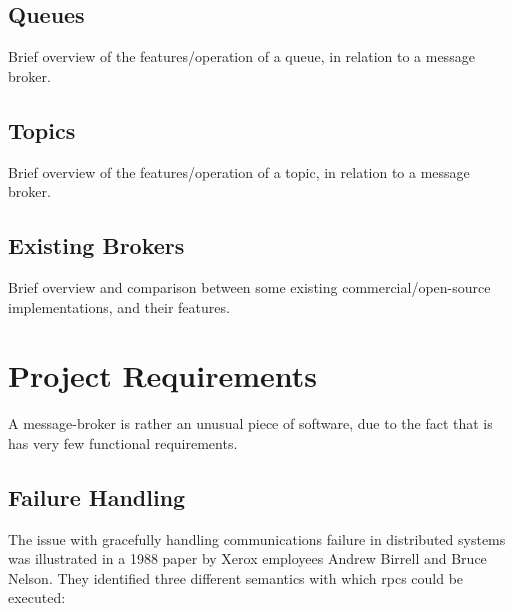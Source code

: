 \subsection{Queues}
\label{sub:Queues}

Brief overview of the features/operation of a queue, in relation to a message broker.


\subsection{Topics}
\label{sub:Topics}

Brief overview of the features/operation of a topic, in relation to a message broker.

\subsection{Existing Brokers}
\label{sub:Existing Brokers}

Brief overview and comparison between some existing commercial/open-source
implementations, and their features.


\section{Project Requirements}
\label{sec:SLA/QoS Specification}

A message-broker is rather an unusual piece of software, due to the fact that is has very few functional requirements.

\subsection{Failure Handling}
\label{sub:Failure Handling}

The issue with gracefully handling communications failure in distributed systems
was illustrated in a 1988 paper by Xerox employees
Andrew Birrell and Bruce Nelson\cite{Birrell:1988:IRP:59309.59336}. They identified
three different semantics with which \glspl{rpc} could be executed:

